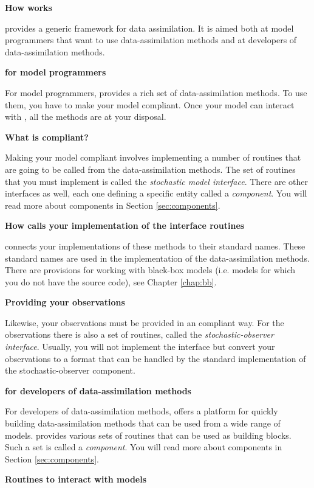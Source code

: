 \textbf{How \oda works}

\oda provides a generic framework for data assimilation. It is aimed both at model programmers that want to use data-assimilation methods and at developers of data-assimilation methods.

\textbf{\oda for model programmers}

For model programmers, \oda provides a rich set of data-assimilation methods. To use them, you have to make your model \oda compliant. Once your model can interact with \oda, all the \oda methods are at your disposal.

\textbf{What is \oda compliant?}

Making your model \oda compliant involves implementing a number of routines that are going to be called from the data-assimilation methods. The set of routines that you must implement is called the \emph{stochastic model interface}. There are other interfaces as well, each one defining a specific entity called a \emph{component}. You will read more about components in Section \ref{sec:components}.

\textbf{How \oda calls your implementation of the interface routines}

\oda connects your implementations of these methods to their standard names. These standard names are used in the implementation of the data-assimilation methods. There are provisions for working with black-box models (i.e. models for which you do not have the source code), see Chapter \ref{chap:bb}.

\textbf{Providing your observations}

Likewise, your observations must be provided in an \oda compliant way. For the observations there is also a set of routines, called the \emph{stochastic-observer interface}. Usually, you will not implement the interface but convert your observations to a format that can be handled by the standard \oda implementation of the stochastic-observer component.

\textbf{\oda for developers of data-assimilation methods}

For developers of data-assimilation methods, \oda offers a platform for quickly building data-assimilation methods that can be used from a wide range of models. \oda provides various sets of routines that can be used as building blocks. Such a set is called a \emph{component}. You will read more about components in Section \ref{sec:components}.

\textbf{Routines to interact with models}

